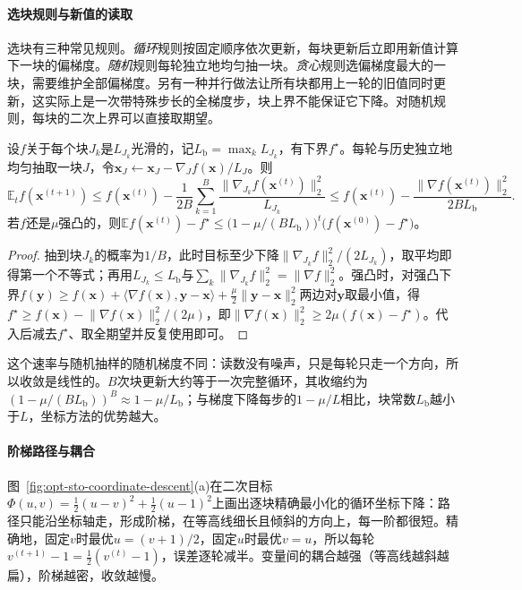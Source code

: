 \paragraph{选块规则与新值的读取}
选块有三种常见规则。\emph{循环}规则按固定顺序依次更新，每块更新后立即用新值计算下一块的偏梯度。\emph{随机}规则每轮独立地均匀抽一块。\emph{贪心}规则选偏梯度最大的一块，需要维护全部偏梯度。另有一种并行做法让所有块都用上一轮的旧值同时更新，这实际上是一次带特殊步长的全梯度步，块上界不能保证它下降。对随机规则，每块的二次上界可以直接取期望。

\begin{theorem}[随机块坐标下降]
\label{thm:opt-sto-random-block}
设$f$关于每个块$J_k$是$L_{J_k}$光滑的，记$L_{\mathrm b}=\max_kL_{J_k}$，有下界$f^\star$。每轮与历史独立地均匀抽取一块$J$，令$\bm x_J\gets\bm x_J-\nabla_Jf(\bm x)/L_J$。则
\[
  \mathbb E_tf(\bm x^{(t+1)})\leq f(\bm x^{(t)})-\frac1{2B}\sum_{k=1}^B\frac{\lVert\nabla_{J_k}f(\bm x^{(t)})\rVert_2^2}{L_{J_k}}\leq f(\bm x^{(t)})-\frac{\lVert\nabla f(\bm x^{(t)})\rVert_2^2}{2BL_{\mathrm b}} .
\]
若$f$还是$\mu$强凸的，则$\mathbb Ef(\bm x^{(t)})-f^\star\leq\bigl(1-\mu/(BL_{\mathrm b})\bigr)^t\bigl(f(\bm x^{(0)})-f^\star\bigr)$。
\end{theorem}

\begin{proof}
抽到块$J_k$的概率为$1/B$，此时目标至少下降$\lVert\nabla_{J_k}f\rVert_2^2/(2L_{J_k})$，取平均即得第一个不等式；再用$L_{J_k}\leq L_{\mathrm b}$与$\sum_k\lVert\nabla_{J_k}f\rVert_2^2=\lVert\nabla f\rVert_2^2$。强凸时，对强凸下界$f(\bm y)\geq f(\bm x)+\langle\nabla f(\bm x),\bm y-\bm x\rangle+\tfrac\mu2\lVert\bm y-\bm x\rVert_2^2$两边对$\bm y$取最小值，得$f^\star\geq f(\bm x)-\lVert\nabla f(\bm x)\rVert_2^2/(2\mu)$，即$\lVert\nabla f(\bm x)\rVert_2^2\geq2\mu(f(\bm x)-f^\star)$。代入后减去$f^\star$、取全期望并反复使用即可。
\end{proof}

这个速率与随机抽样的随机梯度不同：读数没有噪声，只是每轮只走一个方向，所以收敛是线性的。$B$次块更新大约等于一次完整循环，其收缩约为$(1-\mu/(BL_{\mathrm b}))^B\approx1-\mu/L_{\mathrm b}$；与梯度下降每步的$1-\mu/L$相比，块常数$L_{\mathrm b}$越小于$L$，坐标方法的优势越大。

\paragraph{阶梯路径与耦合}
图~\ref{fig:opt-sto-coordinate-descent}(a)在二次目标$\Phi(u,v)=\tfrac12(u-v)^2+\tfrac12(u-1)^2$上画出逐块精确最小化的循环坐标下降：路径只能沿坐标轴走，形成阶梯，在等高线细长且倾斜的方向上，每一阶都很短。精确地，固定$v$时最优$u=(v+1)/2$，固定$u$时最优$v=u$，所以每轮$v^{(t+1)}-1=\tfrac12(v^{(t)}-1)$，误差逐轮减半。变量间的耦合越强（等高线越斜越扁），阶梯越密，收敛越慢。

